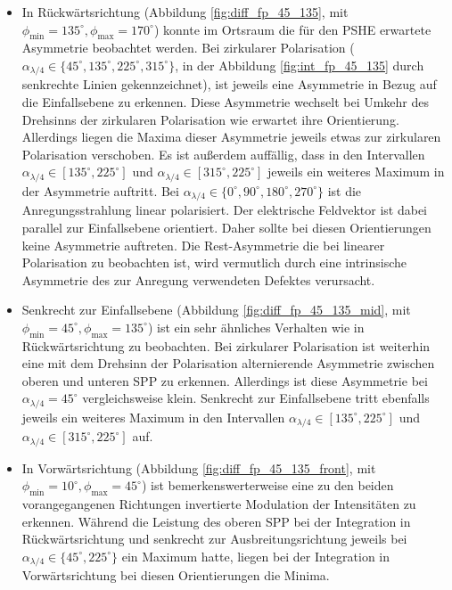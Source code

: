 \documentclass[titlepage,  ngerman]{article}
\begin{document}
			\begin{itemize}
				\item In Rückwärtsrichtung (Abbildung \ref{fig:diff_fp_45_135},  mit $\phi_\mathrm{min} =135^\circ, \phi_\mathrm{max}=170^\circ$) konnte im Ortsraum die für den PSHE erwartete Asymmetrie beobachtet werden. Bei zirkularer Polarisation ($\alpha_{\lambda/4} \in \{45^\circ, 135^\circ, 225^\circ, 315^\circ\}$, in der Abbildung \ref{fig:int_fp_45_135} durch senkrechte Linien gekennzeichnet), ist jeweils eine Asymmetrie in Bezug auf die Einfallsebene zu erkennen. Diese Asymmetrie wechselt bei Umkehr des Drehsinns der zirkularen Polarisation wie erwartet ihre Orientierung. Allerdings liegen die Maxima dieser Asymmetrie jeweils etwas zur zirkularen Polarisation verschoben. Es ist außerdem auffällig, dass in den Intervallen $\alpha_{\lambda/4} \in [135^\circ,225^\circ]$ und $\alpha_{\lambda/4} \in [315^\circ, 225^\circ]$ jeweils ein weiteres Maximum in der Asymmetrie auftritt. Bei $\alpha_{\lambda/4} \in \{0^\circ, 90^\circ, 180^\circ, 270^\circ\}$ ist die Anregungsstrahlung linear polarisiert. Der elektrische Feldvektor ist dabei parallel zur Einfallsebene orientiert. Daher sollte bei diesen Orientierungen keine Asymmetrie auftreten. Die Rest-Asymmetrie die bei linearer Polarisation zu beobachten ist, wird vermutlich durch eine intrinsische Asymmetrie des zur Anregung verwendeten Defektes verursacht. 
				\item Senkrecht zur Einfallsebene (Abbildung \ref{fig:diff_fp_45_135_mid},  mit $\phi_\mathrm{min} =45^\circ, \phi_\mathrm{max}=135^\circ$) ist ein sehr ähnliches Verhalten wie in Rückwärtsrichtung zu beobachten. Bei zirkularer Polarisation ist weiterhin eine mit dem Drehsinn der Polarisation alternierende Asymmetrie zwischen oberen und unteren SPP zu erkennen. Allerdings ist diese Asymmetrie bei $\alpha_{\lambda/4}=45^\circ$ vergleichsweise klein. Senkrecht zur Einfallsebene tritt ebenfalls jeweils ein weiteres Maximum in den Intervallen $\alpha_{\lambda/4} \in [135^\circ,225^\circ]$ und $\alpha_{\lambda/4} \in [315^\circ, 225^\circ]$ auf.
				\item
				In Vorwärtsrichtung (Abbildung \ref{fig:diff_fp_45_135_front},  mit  $\phi_\mathrm{min} =10^\circ, \phi_\mathrm{max}=45^\circ$) ist bemerkenswerterweise eine zu den beiden vorangegangenen Richtungen invertierte Modulation der Intensitäten zu erkennen. Während die Leistung des oberen SPP bei der Integration in Rückwärtsrichtung und senkrecht zur Ausbreitungsrichtung jeweils bei $\alpha_{\lambda /4} \in \{45^\circ, 225^\circ\}$ ein Maximum hatte, liegen bei der Integration in Vorwärtsrichtung bei diesen Orientierungen die Minima.
			\end{itemize}
		\FloatBarrier
\end{document}
